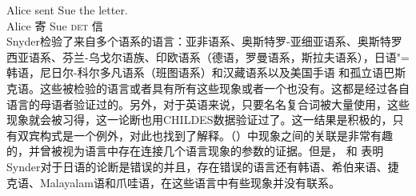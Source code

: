 \ex 
\gll Alice sent Sue the letter.\\ 
    Alice 寄 Sue \textsc{det} 信\\           
\zl 
Snyder检验了来自多个语系的语言：亚非语系、奥斯特罗-亚细亚语系、奥斯特罗西亚语系、芬兰-乌戈尔语族、印欧语系（德语，罗曼语系，斯拉夫语系），日语"=韩语，尼日尔-科尔多凡语系（班图语系）和汉藏语系以及美国手语 和孤立语巴斯克语。这些被检验的语言或者具有所有这些现象或者一个也没有。这都是经过各自语言的母语者验证过的。另外，对于英语来说，只要名名复合词被大量使用，这些现象就会被习得，这一论断也用CHILDES数据验证过了。这一结果是积极的，只有双宾构式是一个例外，对此也找到了解释。（）中现象之间的关联是非常有趣的，并曾被视为语言中存在连接几个语言现象的参数的证据。但是， \citet{Son2007a}和 \citet{SonS2008a}表明Synder对于日语的论断是错误的并且，存在错误的语言还有韩语、希伯来语、捷克语、Malayalam语和爪哇语，在这些语言中有些现象并没有联系。

